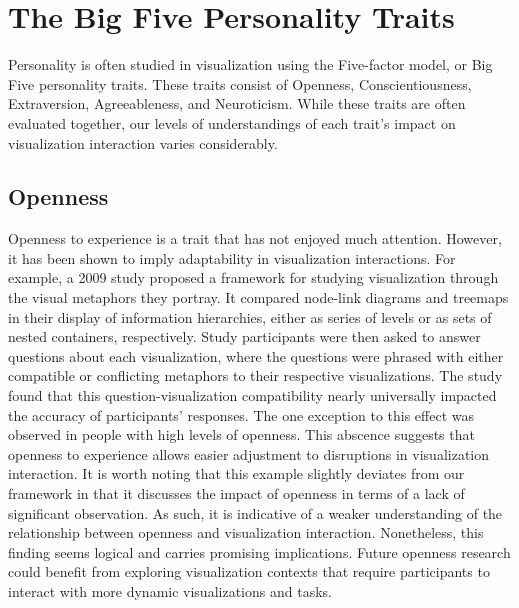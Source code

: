 \documentclass[conference]{IEEEtran}
\begin{document}




\section{The Big Five Personality Traits}
Personality is often studied in visualization using the Five-factor model, or
Big Five personality traits. These traits consist of Openness, Conscientiousness,
Extraversion, Agreeableness, and Neuroticism. While these traits are often
evaluated together, our levels of understandings of each trait's impact on visualization
interaction varies considerably.

\subsection{Openness}\label{Openness}
Openness to experience is a trait that has not enjoyed much attention. However, it has
been shown to imply adaptability in visualization interactions. For example, a 2009 study
proposed a framework for studying visualization through the visual metaphors they
portray. It compared node-link diagrams and treemaps in their display of information
hierarchies, either as series of levels or as sets of nested containers, respectively.
Study participants were then asked to answer questions about each visualization, where
the questions were phrased with either compatible or conflicting metaphors to their
respective visualizations. The study found that this question-visualization compatibility
nearly universally impacted the accuracy of participants’ responses. The one exception
to this effect was observed in people with high levels of openness. This abscence suggests
that openness to experience allows easier adjustment to disruptions in visualization
interaction. It is worth noting that this example slightly deviates from our framework
in that it discusses the impact of openness in terms of a lack of significant observation.
As such, it is indicative of a weaker understanding of the relationship between openness
and visualization interaction. Nonetheless, this finding seems logical and carries
promising implications. Future openness research could benefit from exploring visualization
contexts that require participants to interact with more dynamic visualizations and tasks.
\end{document}
